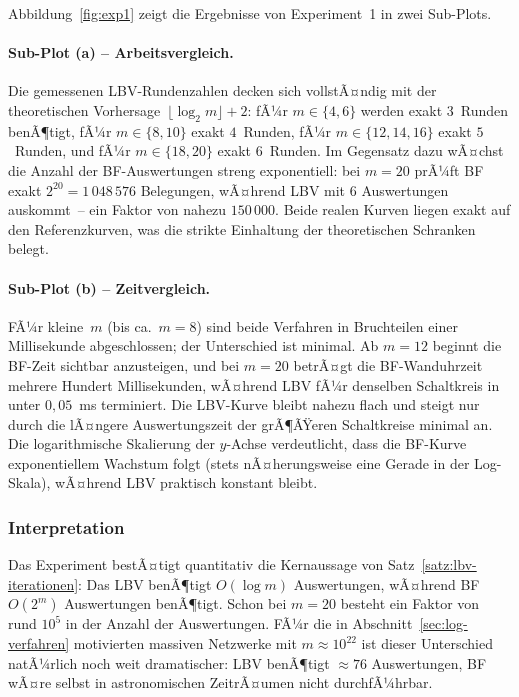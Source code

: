 ﻿\documentclass[a4paper,12pt]{article}
\theoremstyle{definition}
\begin{document}
Abbildung~\ref{fig:exp1} zeigt die Ergebnisse von Experiment~1 in zwei Sub-Plots.

\paragraph{Sub-Plot (a) -- Arbeitsvergleich.}
Die gemessenen LBV-Rundenzahlen decken sich vollstÃ¤ndig mit der theoretischen
Vorhersage~$\lfloor\log_2 m\rfloor + 2$: fÃ¼r $m \in \{4,6\}$ werden exakt
$3$~Runden benÃ¶tigt, fÃ¼r $m \in \{8,10\}$ exakt $4$~Runden, fÃ¼r
$m \in \{12,14,16\}$ exakt $5$~Runden, und fÃ¼r $m \in \{18,20\}$ exakt
$6$~Runden.  Im Gegensatz dazu wÃ¤chst die Anzahl der BF-Auswertungen streng
exponentiell: bei $m = 20$ prÃ¼ft BF exakt $2^{20} = 1\,048\,576$ Belegungen,
wÃ¤hrend LBV mit 6 Auswertungen auskommt~-- ein Faktor von nahezu $150\,000$.
Beide realen Kurven liegen exakt auf den Referenzkurven, was die strikte
Einhaltung der theoretischen Schranken belegt.

\paragraph{Sub-Plot (b) -- Zeitvergleich.}
FÃ¼r kleine~$m$ (bis ca.\ $m = 8$) sind beide Verfahren in Bruchteilen einer
Millisekunde abgeschlossen; der Unterschied ist minimal.  Ab $m = 12$ beginnt
die BF-Zeit sichtbar anzusteigen, und bei $m = 20$ betrÃ¤gt die BF-Wanduhrzeit
mehrere Hundert Millisekunden, wÃ¤hrend LBV fÃ¼r denselben Schaltkreis in
unter $0{,}05$~ms terminiert.  Die LBV-Kurve bleibt nahezu flach und steigt
nur durch die lÃ¤ngere Auswertungszeit der grÃ¶ÃŸeren Schaltkreise minimal an.
Die logarithmische Skalierung der $y$-Achse verdeutlicht, dass die BF-Kurve
exponentiellem Wachstum folgt (stets nÃ¤herungsweise eine Gerade in der Log-Skala),
wÃ¤hrend LBV praktisch konstant bleibt.

\subsubsection{Interpretation}

Das Experiment bestÃ¤tigt quantitativ die Kernaussage von
Satz~\ref{satz:lbv-iterationen}: Das LBV benÃ¶tigt $O(\log m)$ Auswertungen,
wÃ¤hrend BF $O(2^m)$ Auswertungen benÃ¶tigt.  Schon bei $m = 20$ besteht ein
Faktor von rund $10^5$ in der Anzahl der Auswertungen.  FÃ¼r die in
Abschnitt~\ref{sec:log-verfahren} motivierten massiven Netzwerke mit
$m \approx 10^{22}$ ist dieser Unterschied natÃ¼rlich noch weit dramatischer:
LBV benÃ¶tigt $\approx 76$ Auswertungen, BF wÃ¤re selbst in astronomischen
ZeitrÃ¤umen nicht durchfÃ¼hrbar.
\end{document}
